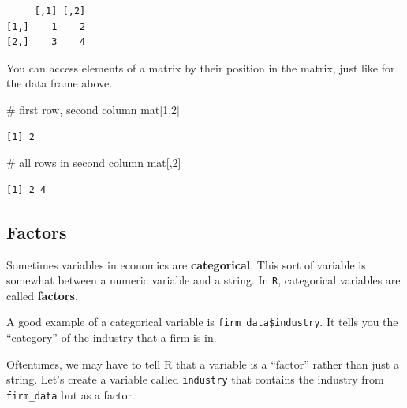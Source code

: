 \documentclass[
  letterpaper,
  DIV=11,
  numbers=noendperiod]{scrreprt}
\newenvironment{Shaded}{\begin{snugshade}}{\end{snugshade}}
\newcommand{\CommentTok}[1]{\textcolor[rgb]{0.37,0.37,0.37}{#1}}
\newcommand{\DecValTok}[1]{\textcolor[rgb]{0.68,0.00,0.00}{#1}}
\newcommand{\FunctionTok}[1]{\textcolor[rgb]{0.28,0.35,0.67}{#1}}
\newcommand{\NormalTok}[1]{\textcolor[rgb]{0.00,0.23,0.31}{#1}}
\newcommand{\OtherTok}[1]{\textcolor[rgb]{0.00,0.23,0.31}{#1}}
\newcommand{\SpecialCharTok}[1]{\textcolor[rgb]{0.37,0.37,0.37}{#1}}
\begin{document}
\begin{verbatim}
     [,1] [,2]
[1,]    1    2
[2,]    3    4
\end{verbatim}

You can access elements of a matrix by their position in the matrix,
just like for the data frame above.

\begin{Shaded}
\begin{Highlighting}[]
\CommentTok{\# first row, second column}
\NormalTok{mat[}\DecValTok{1}\NormalTok{,}\DecValTok{2}\NormalTok{]}
\end{Highlighting}
\end{Shaded}

\begin{verbatim}
[1] 2
\end{verbatim}

\begin{Shaded}
\begin{Highlighting}[]
\CommentTok{\# all rows in second column}
\NormalTok{mat[,}\DecValTok{2}\NormalTok{] }
\end{Highlighting}
\end{Shaded}

\begin{verbatim}
[1] 2 4
\end{verbatim}

\subsection{Factors}\label{factors}

Sometimes variables in economics are \textbf{categorical}. This sort of
variable is somewhat between a numeric variable and a string. In
\texttt{R}, categorical variables are called \textbf{factors}.

A good example of a categorical variable is
\texttt{firm\_data\$industry}. It tells you the ``category'' of the
industry that a firm is in.

Oftentimes, we may have to tell R that a variable is a ``factor'' rather
than just a string. Let's create a variable called \texttt{industry}
that contains the industry from \texttt{firm\_data} but as a factor.

\begin{Shaded}
\end{Shaded}
\end{document}
